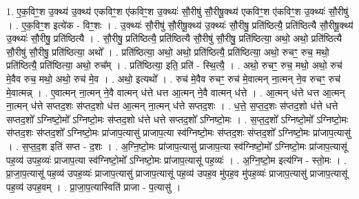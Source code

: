 \documentclass[17pt]{extarticle}
\begin{document}
1. ए॒क॒विꣳ॒॒श उ॒क्थ्य॑ उ॒क्थ्य॑ एकविꣳ॒॒श ए॑कविꣳ॒॒श उ॒क्थ्यः॑ सौ॒रीषु॑ सौ॒रीषू॒क्थ्य॑ एकविꣳ॒॒श ए॑कविꣳ॒॒श उ॒क्थ्यः॑ सौ॒रीषु॑ । . ए॒क॒विꣳ॒॒श इत्ये॑क - विꣳ॒॒शः । . उ॒क्थ्यः॑ सौ॒रीषु॑ सौ॒रीषू॒क्थ्य॑ उ॒क्थ्यः॑ सौ॒रीषु॒ प्रति॑ष्ठित्यै॒ प्रति॑ष्ठित्यै सौ॒रीषू॒क्थ्य॑ उ॒क्थ्यः॑ सौ॒रीषु॒ प्रति॑ष्ठित्यै । . सौ॒रीषु॒ प्रति॑ष्ठित्यै॒ प्रति॑ष्ठित्यै सौ॒रीषु॑ सौ॒रीषु॒ प्रति॑ष्ठित्या॒ अथो॒ अथो॒ प्रति॑ष्ठित्यै सौ॒रीषु॑ सौ॒रीषु॒ प्रति॑ष्ठित्या॒ अथो᳚ । . प्रति॑ष्ठित्या॒ अथो॒ अथो॒ प्रति॑ष्ठित्यै॒ प्रति॑ष्ठित्या॒ अथो॒ रुचꣳ॒॒ रुच॒ मथो॒ प्रति॑ष्ठित्यै॒ प्रति॑ष्ठित्या॒ अथो॒ रुच᳚म् । . प्रति॑ष्ठित्या॒ इति॒ प्रति॑ - स्थि॒त्यै॒ । . अथो॒ रुचꣳ॒॒ रुच॒ मथो॒ अथो॒ रुच॑ मे॒वैव रुच॒ मथो॒ अथो॒ रुच॑ मे॒व । . अथो॒ इत्यथो᳚ । . रुच॑ मे॒वैव रुचꣳ॒॒ रुच॑ मे॒वात्मन् ना॒त्मन् ने॒व रुचꣳ॒॒ रुच॑ मे॒वात्मन्न् । . ए॒वात्मन् ना॒त्मन् ने॒वै वात्मन् ध॑त्ते धत्त आ॒त्मन् ने॒वै वात्मन् ध॑त्ते । . आ॒त्मन् ध॑त्ते धत्त आ॒त्मन् ना॒त्मन् ध॑त्ते सप्तद॒शः स॑प्तद॒शो ध॑त्त आ॒त्मन् ना॒त्मन् ध॑त्ते सप्तद॒शः । . ध॒त्ते॒ स॒प्त॒द॒शः स॑प्तद॒शो ध॑त्ते धत्ते सप्तद॒शो᳚ ऽग्निष्टो॒मो᳚ ऽग्निष्टो॒मः स॑प्तद॒शो ध॑त्ते धत्ते सप्तद॒शो᳚ ऽग्निष्टो॒मः । . स॒प्त॒द॒शो᳚ ऽग्निष्टो॒मो᳚ ऽग्निष्टो॒मः स॑प्तद॒शः स॑प्तद॒शो᳚ ऽग्निष्टो॒मः प्रा॑जाप॒त्यासु॑ प्राजाप॒त्या स्व॑ग्निष्टो॒मः स॑प्तद॒शः स॑प्तद॒शो᳚ ऽग्निष्टो॒मः प्रा॑जाप॒त्यासु॑ । . स॒प्त॒द॒श इति॑ सप्त - द॒शः । . अ॒ग्नि॒ष्टो॒मः प्रा॑जाप॒त्यासु॑ प्राजाप॒त्या स्व॑ग्निष्टो॒मो᳚ ऽग्निष्टो॒मः प्रा॑जाप॒त्यासू॑ पह॒व्य॑ उपह॒व्यः॑ प्राजाप॒त्या स्व॑ग्निष्टो॒मो᳚ ऽग्निष्टो॒मः प्रा॑जाप॒त्यासू॑ पह॒व्यः॑ । . अ॒ग्नि॒ष्टो॒म इत्य॑ग्नि - स्तो॒मः । . प्रा॒जा॒प॒त्यासू॑ पह॒व्य॑ उपह॒व्यः॑ प्राजाप॒त्यासु॑ प्राजाप॒त्यासू॑ पह॒व्य॑ उपह॒व मु॑पह॒व मु॑पह॒व्यः॑ प्राजाप॒त्यासु॑ प्राजाप॒त्यासू॑ पह॒व्य॑ उपह॒वम् । . प्रा॒जा॒प॒त्यास्विति॑ प्राजा - प॒त्यासु॑ । \newline
\end{document}
